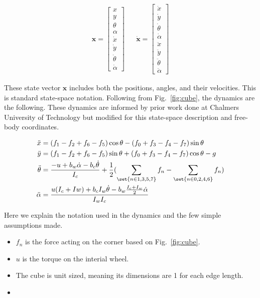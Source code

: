 \documentclass[conference]{IEEEtran}
\begin{document}
\begin{align}
  \textbf{x} =
    \begin{bmatrix}
         x \\
         y \\
         \theta \\
         \alpha \\
         \dot x \\
         \dot y \\
         \dot \theta \\
         \dot \alpha
    \end{bmatrix} &&
  \bm{\dot x} =
    \begin{bmatrix}
         \dot x \\
         \dot y \\
         \dot \theta \\
         \dot \alpha \\
         \ddot x \\
         \ddot y \\
         \ddot \theta \\
         \ddot \alpha
    \end{bmatrix}
\end{align}

These state vector $\textbf{x}$ includes both the positions, angles, and their velocities. This is standard state-space notation. Following from Fig.~\ref{fig:cube}, the dynamics are the following. These dynamics are informed by prior work done at Chalmers University of Technology \cite{b4} but modified for this state-space description and free-body coordinates.

\begin{align}
\ddot x &= (f_{1}-f_{2}+f_{6}-f_{5})\cos{\theta} - (f_{0}+f_{3}-f_{4}-f_{7})\sin{\theta} \\
\ddot y &= (f_{1}-f_{2}+f_{6}-f_{5})\sin{\theta} + (f_{0}+f_{3}-f_{4}-f_{7})\cos{\theta}-g \\
\ddot \theta &= \frac{-u + b_{w}\dot\alpha - b_{c}\dot\theta}{I_c} + \frac{1}{2}(\sum_{\set{n\in{1,3,5,7}}} f_{n} - \sum_{\set{n\in{0,2,4,6}}} f_{n}) \\
\ddot \alpha &= \frac{u(I_{c}+I{w}) + b_{c}I_{w}\dot\theta - b_{w}\frac{I_{c}+I_{w}}{2}\dot\alpha}{I_{w}I_{c}}
\end{align}

Here we explain the notation used in the dynamics and the few simple assumptions made. \\
\begin{itemize}
\item $f_{n}$ is the force acting on the corner based on Fig.~\ref{fig:cube}.
\item $u$ is the torque on the interial wheel.
\item The cube is unit sized, meaning its dimensions are 1 for each edge length.
\item 
\end{itemize}
\end{document}
